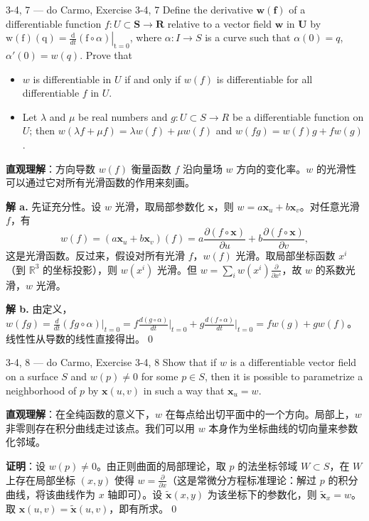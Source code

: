 \begin{exercise}{3-4, 7 — do Carmo, Exercise 3-4, 7}
Define the derivative $\mathbf{w}(\mathbf{f})$ of a differentiable function $f\colon U\subset \mathbf{S}\to \mathbf{R}$ relative to a vector field $\mathbf{w}$ in $\mathbf{U}$ by $\mathrm {w} (\mathrm {f}) (\mathrm {q}) = \left. \frac {\mathrm {d}}{d t} (\mathrm {f} \circ \alpha) \right| _ {\mathrm {t} = 0}$, where $\alpha \colon I \to S$ is a curve such that $\alpha(0) = q$, $\alpha'(0) = w(q)$. Prove that
\begin{itemize}
\item[a.] $w$ is differentiable in $U$ if and only if $w(f)$ is differentiable for all differentiable $f$ in $U$.
\item[b.] Let $\lambda$ and $\mu$ be real numbers and $g\colon U\subset S\to R$ be a differentiable function on $U$; then $w (\lambda f + \mu f) = \lambda w (f) + \mu w (f)$ and $w (f g) = w (f) g + f w (g)$.
\end{itemize}
\end{exercise}
\begin{solution}
\textbf{直观理解}：方向导数 $w(f)$ 衡量函数 $f$ 沿向量场 $w$ 方向的变化率。$w$ 的光滑性可以通过它对所有光滑函数的作用来刻画。

\textbf{解 a.} 先证充分性。设 $w$ 光滑，取局部参数化 $\mathbf{x}$，则 $w = a\mathbf{x}_u + b\mathbf{x}_v$。对任意光滑 $f$，有
\[
w(f) = (a\mathbf{x}_u + b\mathbf{x}_v)(f) = a\frac{\partial(f\circ\mathbf{x})}{\partial u} + b\frac{\partial(f\circ\mathbf{x})}{\partial v},
\]
这是光滑函数。反过来，假设对所有光滑 $f$，$w(f)$ 光滑。取局部坐标函数 $x^i$（到 $\mathbb{R}^3$ 的坐标投影），则 $w(x^i)$ 光滑。但 $w = \sum_i w(x^i)\frac{\partial}{\partial x^i}$，故 $w$ 的系数光滑，$w$ 光滑。

\textbf{解 b.} 由定义，$w(fg) = \frac{d}{dt}(fg\circ\alpha)\big|_{t=0} = f\frac{d(g\circ\alpha)}{dt}\big|_{t=0} + g\frac{d(f\circ\alpha)}{dt}\big|_{t=0} = fw(g) + gw(f)$。线性性从导数的线性直接得出。\qed
\end{solution}

\begin{exercise}{3-4, 8 — do Carmo, Exercise 3-4, 8}
Show that if $w$ is a differentiable vector field on a surface $S$ and $w(p) \neq 0$ for some $p \in S$, then it is possible to parametrize a neighborhood of $p$ by $\mathbf{x}(u, v)$ in such a way that $\mathbf{x}_u = w$.
\end{exercise}
\begin{solution}
\textbf{直观理解}：在全纯函数的意义下，$w$ 在每点给出切平面中的一个方向。局部上，$w$ 非零则存在积分曲线走过该点。我们可以用 $w$ 本身作为坐标曲线的切向量来参数化邻域。

\textbf{证明}：设 $w(p) \neq 0$。由正则曲面的局部理论，取 $p$ 的法坐标邻域 $W \subset S$，在 $W$ 上存在局部坐标 $(x,y)$ 使得 $w = \frac{\partial}{\partial x}$（这是常微分方程标准理论：解过 $p$ 的积分曲线，将该曲线作为 $x$ 轴即可）。设 $\tilde{\mathbf{x}}(x,y)$ 为该坐标下的参数化，则 $\tilde{\mathbf{x}}_x = w$。取 $\mathbf{x}(u,v) = \tilde{\mathbf{x}}(u,v)$，即有所求。\qed
\end{solution}

